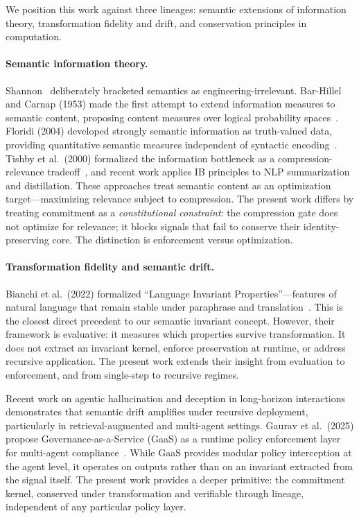 \documentclass[11pt,a4paper]{article}
\begin{document}
We position this work against three lineages: semantic extensions of information theory, transformation fidelity and drift, and conservation principles in computation.

\paragraph{Semantic information theory.}
Shannon~\cite{shannon1948} deliberately bracketed semantics as engineering-irrelevant. Bar-Hillel and Carnap (1953) made the first attempt to extend information measures to semantic content, proposing content measures over logical probability spaces~\cite{barhillel1953}. Floridi (2004) developed strongly semantic information as truth-valued data, providing quantitative semantic measures independent of syntactic encoding~\cite{floridi2004}. Tishby et al.\ (2000) formalized the information bottleneck as a compression-relevance tradeoff~\cite{tishby2000}, and recent work applies IB principles to NLP summarization and distillation. These approaches treat semantic content as an optimization target---maximizing relevance subject to compression. The present work differs by treating commitment as a \emph{constitutional constraint}: the compression gate does not optimize for relevance; it blocks signals that fail to conserve their identity-preserving core. The distinction is enforcement versus optimization.

\paragraph{Transformation fidelity and semantic drift.}
Bianchi et al.\ (2022) formalized ``Language Invariant Properties''---features of natural language that remain stable under paraphrase and translation~\cite{bianchi2022}. This is the closest direct precedent to our semantic invariant concept. However, their framework is evaluative: it measures which properties survive transformation. It does not extract an invariant kernel, enforce preservation at runtime, or address recursive application. The present work extends their insight from evaluation to enforcement, and from single-step to recursive regimes.

Recent work on agentic hallucination and deception in long-horizon interactions~\cite{xu2026,yeh2026lumina} demonstrates that semantic drift amplifies under recursive deployment, particularly in retrieval-augmented and multi-agent settings. Gaurav et al.\ (2025) propose Governance-as-a-Service (GaaS) as a runtime policy enforcement layer for multi-agent compliance~\cite{gaurav2025}. While GaaS provides modular policy interception at the agent level, it operates on outputs rather than on an invariant extracted from the signal itself. The present work provides a deeper primitive: the commitment kernel, conserved under transformation and verifiable through lineage, independent of any particular policy layer.
\end{document}
